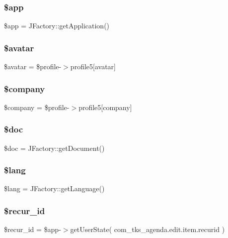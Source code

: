 \subsubsection{\$app}
{\footnotesize\ttfamily \$app = J\+Factory\+::get\+Application()}

\mbox{\label{addtmpl_8php_ac62167326fcdc762297fe76407218b55}} 
\subsubsection{\$avatar}
{\footnotesize\ttfamily \$avatar = \$profile-\/$>$profile5[\textquotesingle{}avatar\textquotesingle{}]}

\mbox{\label{addtmpl_8php_a3306bb3d7f99fc57bee9e96f928769d4}} 
\subsubsection{\$company}
{\footnotesize\ttfamily \$company = \$profile-\/$>$profile5[\textquotesingle{}company\textquotesingle{}]}

\mbox{\label{addtmpl_8php_afc5e9ce512cd97cf2e0e25bb20dcd39b}} 
\subsubsection{\$doc}
{\footnotesize\ttfamily \$doc = J\+Factory\+::get\+Document()}

\mbox{\label{addtmpl_8php_a7714b111b644017933931ec69a154102}} 
\subsubsection{\$lang}
{\footnotesize\ttfamily \$lang = J\+Factory\+::get\+Language()}

\mbox{\label{addtmpl_8php_aed426ca0f24ef496d83ef6d580ff395e}} 
\subsubsection{\$recur\+\_\+id}
{\footnotesize\ttfamily \$recur\+\_\+id = \$app-\/$>$get\+User\+State( \textquotesingle{}com\+\_\+tks\+\_\+agenda.\+edit.\+item.\+recurid\textquotesingle{} )}

